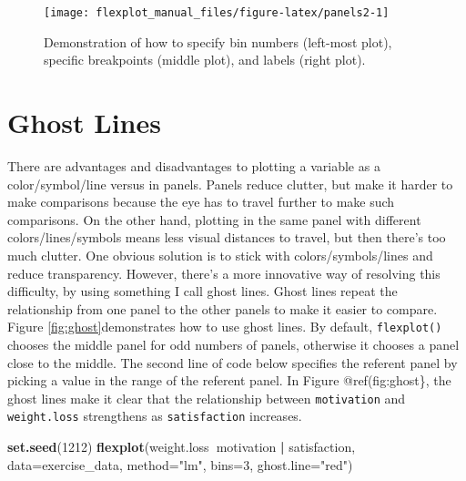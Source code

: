 \documentclass[,]{book}
\newenvironment{Shaded}{\begin{snugshade}}{\end{snugshade}}
\newcommand{\KeywordTok}[1]{\textcolor[rgb]{0.13,0.29,0.53}{\textbf{#1}}}
\newcommand{\DataTypeTok}[1]{\textcolor[rgb]{0.13,0.29,0.53}{#1}}
\newcommand{\DecValTok}[1]{\textcolor[rgb]{0.00,0.00,0.81}{#1}}
\newcommand{\StringTok}[1]{\textcolor[rgb]{0.31,0.60,0.02}{#1}}
\newcommand{\OperatorTok}[1]{\textcolor[rgb]{0.81,0.36,0.00}{\textbf{#1}}}
\newcommand{\NormalTok}[1]{#1}
\begin{document}
\begin{figure}

{\centering \texttt{[image: flexplot\_manual\_files/figure-latex/panels2-1]} 

}

\caption{Demonstration of how to specify bin numbers (left-most plot), specific breakpoints (middle plot), and labels (right plot).}\label{fig:panels2}
\end{figure}

\section*{Ghost Lines}\label{ghost-lines}

There are advantages and disadvantages to plotting a variable as a
color/symbol/line versus in panels. Panels reduce clutter, but make it
harder to make comparisons because the eye has to travel further to make
such comparisons. On the other hand, plotting in the same panel with
different colors/lines/symbols means less visual distances to travel,
but then there's too much clutter. One obvious solution is to stick with
colors/symbols/lines and reduce transparency. However, there's a more
innovative way of resolving this difficulty, by using something I call
ghost lines. Ghost lines repeat the relationship from one panel to the
other panels to make it easier to compare. Figure
\ref{fig:ghost}demonstrates how to use ghost lines. By default,
\texttt{flexplot()} chooses the middle panel for odd numbers of panels,
otherwise it chooses a panel close to the middle. The second line of
code below specifies the referent panel by picking a value in the range
of the referent panel. In Figure @ref(fig:ghost\}, the ghost lines make
it clear that the relationship between \texttt{motivation} and
\texttt{weight.loss} strengthens as \texttt{satisfaction} increases.

\begin{Shaded}
\begin{Highlighting}[]
\KeywordTok{set.seed}\NormalTok{(}\DecValTok{1212}\NormalTok{)}
\KeywordTok{flexplot}\NormalTok{(weight.loss}\OperatorTok{~}\NormalTok{motivation }\OperatorTok{|}\StringTok{ }\NormalTok{satisfaction, }
             \DataTypeTok{data=}\NormalTok{exercise_data, }\DataTypeTok{method=}\StringTok{"lm"}\NormalTok{, }
             \DataTypeTok{bins=}\DecValTok{3}\NormalTok{, }\DataTypeTok{ghost.line=}\StringTok{"red"}\NormalTok{)}
\end{Highlighting}
\end{Shaded}
\end{document}
